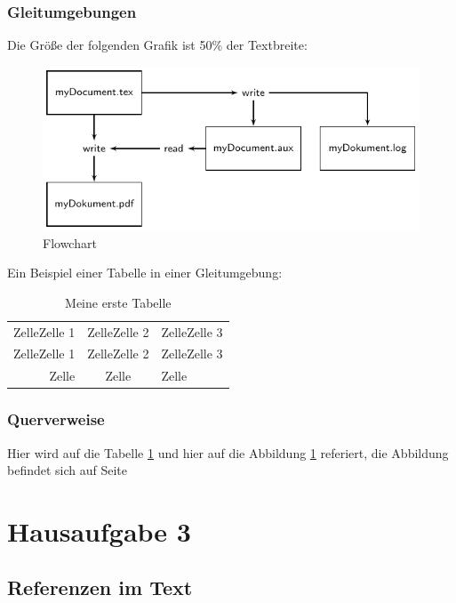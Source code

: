 \documentclass[10pt,paper=a4,abstracton]{scrartcl}
\begin{document}
\subsubsection{Gleitumgebungen}

Die Größe der folgenden Grafik ist 50\% der Textbreite:

\begin{figure}[htbp]
	\centering
	\includegraphics[width=.5\linewidth]{LaTeX_flowchart_1}
	\caption{Flowchart}
	\label{fig:flowchart}
\end{figure}


\blindtext


Ein Beispiel einer Tabelle in einer Gleitumgebung: 

\begin{table}[htbp]
\centering	
\caption{Meine erste Tabelle}
\begin{tabular}[t]{rc|l|}
	ZelleZelle 1 & ZelleZelle 2 & ZelleZelle 3 \\
	ZelleZelle 1 & ZelleZelle 2 & ZelleZelle 3 \\
	\hline
	Zelle & Zelle & Zelle \\
\end{tabular}
\label{fig:Tabelle1}
\end{table}


\subsubsection{Querverweise}

Hier wird auf die Tabelle \ref{fig:Tabelle1} und hier auf die Abbildung \ref{fig:flowchart} referiert, die Abbildung befindet sich auf Seite \pageref{fig:flowchart}


\section{Hausaufgabe 3}


\subsection{Referenzen im Text}
\end{document}
